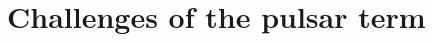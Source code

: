 \documentclass[fleqn,usenatbib,useAMS]{mnras}
\begin{document}
%
%
%






\section{Challenges of the pulsar term}\label{sec:psr_term_challenges}
\end{document}

